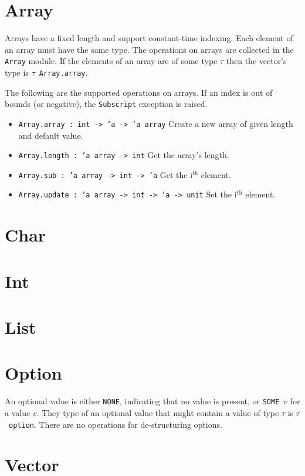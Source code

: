 \documentclass[12pt,a4paper]{book}
\begin{document}
\section{Array}

Arrays have a fixed length and support constant-time indexing. Each element of an array must have the same type. The operations on arrays are collected in the \texttt{Array} module. If the elements of an array are of some type $\tau$ then the vector's type is $\tau$\ \texttt{Array.array}.

The following are the supported operations on arrays. If an index is out of bounds (or negative), the \texttt{Subscript} exception is raised.
\begin{itemize}
\item \texttt{Array.array : int -> 'a -> 'a array} Create a new array of given length and default value.
\item \texttt{Array.length : 'a array -> int} Get the array's length.
\item \texttt{Array.sub : 'a array -> int -> 'a} Get the i$^\textrm{th}$ element.
\item \texttt{Array.update : 'a array -> int -> 'a -> unit} Set the i$^\textrm{th}$ element.
\end{itemize}

\section{Char}

\section{Int}

\section{List}

\section{Option} An optional value is either \texttt{NONE}, indicating that no value is present, or \texttt{SOME}\ $v$ for a value $v$. They type of an optional value that might contain a value of type $\tau$ is $\tau$\ \texttt{option}. There are no operations for de-structuring options.

\section{Vector}
\end{document}
